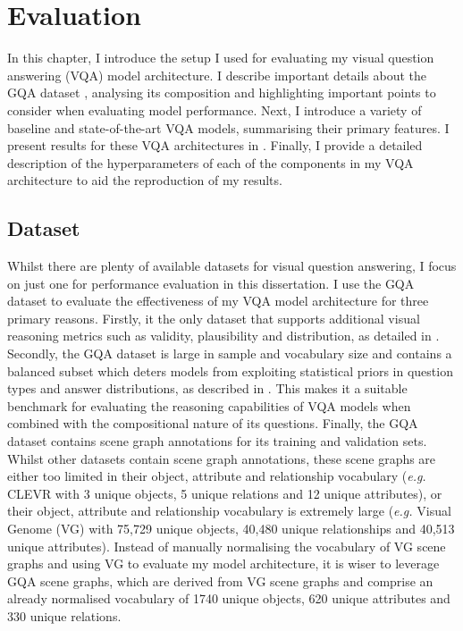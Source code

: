 \chapter{Evaluation}
\label{chapter:evaluation}

In this chapter, I introduce the setup I used for evaluating my visual question answering (VQA) model architecture. I describe important details about the GQA dataset \cite{hudson2019gqa}, analysing its composition and highlighting important points to consider when evaluating model performance. Next, I introduce a variety of baseline and state-of-the-art VQA models, summarising their primary features. I present results for these VQA architectures in \sectionautorefname{ \ref{section:performance_evaluation}}. Finally, I provide a detailed description of the hyperparameters of each of the components in my VQA architecture to aid the reproduction of my results.

\section{Dataset}

Whilst there are plenty of available datasets for visual question answering, I focus on just one for performance evaluation in this dissertation. I use the GQA dataset to evaluate the effectiveness of my VQA model architecture for three primary reasons. Firstly, it the only dataset that supports additional visual reasoning metrics such as validity, plausibility and distribution, as detailed in \subsectionautorefname{ \ref{subsec:visual_reasoning_metrics}}. Secondly, the GQA dataset is large in sample and vocabulary size and contains a balanced subset which deters models from exploiting statistical priors in question types and answer distributions, as described in \subsectionautorefname{ \ref{subsec:lanauge_priors_in_vqa_datasets}}. This makes it a suitable benchmark for evaluating the reasoning capabilities of VQA models when combined with the compositional nature of its questions. Finally, the GQA dataset contains scene graph annotations for its training and validation sets. Whilst other datasets contain scene graph annotations, these scene graphs are either too limited in their object, attribute and relationship vocabulary (\textit{e.g.} CLEVR \cite{johnson2017clevr} with 3 unique objects, 5 unique relations and 12 unique attributes), or their object, attribute and relationship vocabulary is extremely large (\textit{e.g.} Visual Genome (VG) \cite{krishna2017visual} with 75,729 unique objects, 40,480 unique relationships and 40,513 unique attributes). Instead of manually normalising the vocabulary of VG scene graphs and using VG to evaluate my model architecture, it is wiser to leverage GQA scene graphs, which are derived from VG scene graphs and comprise an already normalised vocabulary of 
1740 unique objects, 620 unique attributes and 330 unique relations.

